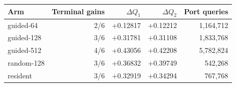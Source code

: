 \begin{tabular}{lrrrr}
\toprule
Arm & Terminal gains & $\Delta Q_1$ & $\Delta Q_2$ & Port queries \\
\midrule
guided-64 & 2/6 & +0.12817 & +0.12212 & 1,164,712 \\
guided-128 & 3/6 & +0.31781 & +0.31108 & 1,833,768 \\
guided-512 & 4/6 & +0.43056 & +0.42208 & 5,782,824 \\
random-128 & 3/6 & +0.36832 & +0.39749 & 542,268 \\
resident & 3/6 & +0.32919 & +0.34294 & 767,768 \\
\bottomrule
\end{tabular}
